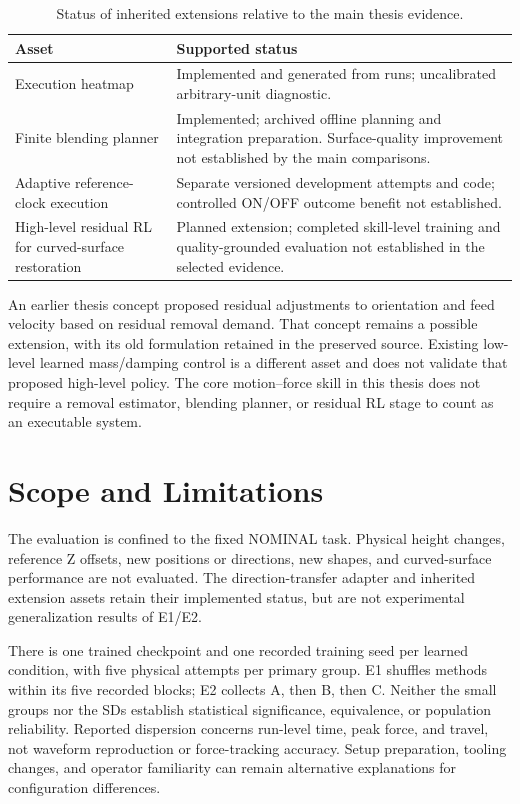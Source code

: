 \begin{table}[tbp]\centering\small
\caption[Status of inherited extensions]{Status of inherited extensions relative to the main thesis evidence.}
\label{tab:extension_status}
\begin{tabularx}{\textwidth}{P{0.32\textwidth}X}
\toprule Asset & Supported status \\ \midrule
Execution heatmap & Implemented and generated from runs; uncalibrated arbitrary-unit diagnostic. \\
Finite blending planner & Implemented; archived offline planning and integration preparation. Surface-quality improvement not established by the main comparisons. \\
Adaptive reference-clock execution & Separate versioned development attempts and code; controlled ON/OFF outcome benefit not established. \\
High-level residual RL for curved-surface restoration & Planned extension; completed skill-level training and quality-grounded evaluation not established in the selected evidence. \\
\bottomrule
\end{tabularx}
\end{table}

An earlier thesis concept proposed residual adjustments to orientation and feed velocity based on residual removal demand. That concept remains a possible extension, with its old formulation retained in the preserved source. Existing low-level learned mass/damping control is a different asset and does not validate that proposed high-level policy. The core motion--force skill in this thesis does not require a removal estimator, blending planner, or residual RL stage to count as an executable system.

\section{Scope and Limitations}
The evaluation is confined to the fixed NOMINAL task. Physical height changes, reference Z offsets, new positions or directions, new shapes, and curved-surface performance are not evaluated. The direction-transfer adapter and inherited extension assets retain their implemented status, but are not experimental generalization results of E1/E2.

There is one trained checkpoint and one recorded training seed per learned condition, with five physical attempts per primary group. E1 shuffles methods within its five recorded blocks; E2 collects A, then B, then C. Neither the small groups nor the SDs establish statistical significance, equivalence, or population reliability. Reported dispersion concerns run-level time, peak force, and travel, not waveform reproduction or force-tracking accuracy. Setup preparation, tooling changes, and operator familiarity can remain alternative explanations for configuration differences.

